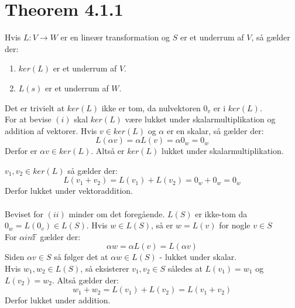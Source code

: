 \documentclass[a4paper,oneside,article]{memoir}
\begin{document}
    \section{Theorem 4.1.1}
    Hvis $L:V\rightarrow W$ er en lineær transformation og $S$ er et underrum af $V$, så gælder der:
    \begin{enumerate}[i]
    \item $ker(L)$ er et underrum af $V$.
    \item $L(s)$ er et underrum af $W$.
    \end{enumerate}
    Det er trivielt at $ker(L)$ ikke er tom, da nulvektoren $0_v$
    er i $ker(L)$.\\
    For at bevise $(i)$ skal $ker(L)$ være lukket under 
    skalarmultiplikation og  addition af vektorer. Hvis $v\in ker(L)$
    og $\alpha$ er en skalar, så gælder der:
    $$L(\alpha v)=\alpha L(v) = \alpha 0_w=0_w$$
    Derfor er $\alpha v \in ker(L)$. Altså er $ker(L)$ lukket 
    under skalarmultiplikation.
    
    $v_1,v_2\in ker(L)$ så gælder der:
    $$L(v_1+v_2)=L(v_1)+L(v_2)=0_w+0_w=0_w$$
    Derfor lukket under vektoraddition.
    \\
    \\
    Beviset for $(ii)$ minder om det foregående. $L(S)$ er ikke-tom
    da $0_w=L(0_v)\in L(S)$. Hvis $w\in L(S)$, så er $w=L(v)$ for
    nogle $v\in S$\\
    For $\alpha in \mathbb{F}$ gælder der:
    $$\alpha w = \alpha L(v) = L(\alpha v)$$
    Siden $\alpha v \in S$ så følger det at $\alpha w \in L(S)$ - 
    lukket under skalar.\\
    Hvis $w_1,w_2 \in L(S)$, så eksisterer $v_1,v_2 \in S$ således
    at $L(v_1)=w_1$ og $L(v_2)=w_2$. Altså gælder der:
    $$w_1+w_2=L(v_1)+L(v_2)=L(v_1+v_2)$$
    Derfor lukket under addition.
    
\end{document}
